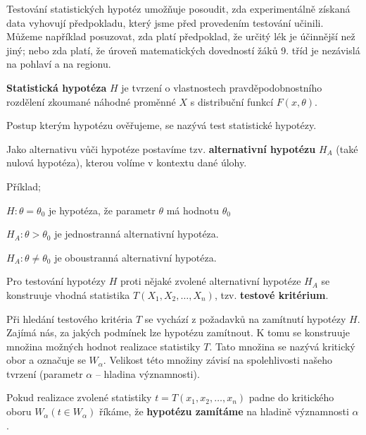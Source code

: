 \begin{compactitem}
    \item Testování statistických hypotéz umožňuje posoudit, zda experimentálně získaná data vyhovují předpokladu, který jsme před provedením testování učinili. Můžeme například posuzovat, zda platí předpoklad, že určitý lék je účinnější než jiný; nebo zda platí, že úroveň matematických dovedností žáků 9. tříd je nezávislá na pohlaví a na regionu.

    \item \textbf{Statistická hypotéza} $H$ je tvrzení o vlastnostech pravděpodobnostního rozdělení zkoumané náhodné proměnné $X$ s distribuční funkcí $F(x, \theta)$. \begin{compactitem}
        \item Postup kterým hypotézu ověřujeme, se nazývá test statistické hypotézy.
    \end{compactitem}

    \item Jako alternativu vůči hypotéze postavíme tzv. \textbf{alternativní hypotézu} $H_A$ (také nulová hypotéza), kterou volíme v kontextu dané úlohy. \begin{compactitem}
        \item Příklad;
        \item $H : \theta = \theta_0$ je  hypotéza, že parametr $\theta$ má hodnotu $\theta_0$
        \item $H_A : \theta > \theta_0$ je jednostranná alternativní hypotéza.
        \item $H_A : \theta \not= \theta_0$ je oboustranná alternativní hypotéza.
    \end{compactitem}

    \item Pro testování hypotézy $H$ proti nějaké zvolené alternativní hypotéze $H_A$ se konstruuje vhodná statistika $T(X_1, X_2, \ldots, X_n)$, tzv. \textbf{testové kritérium}.

    \item Při hledání testového kritéria $T$ se vychází z požadavků na zamítnutí hypotézy $H$. Zajímá nás, za jakých podmínek lze hypotézu zamítnout. K tomu se konstruuje množina možných hodnot realizace statistiky $T$. Tato množina se nazývá kritický obor a označuje se $W_{\alpha}$. Velikost této množiny závisí na spolehlivosti našeho tvrzení (parametr $\alpha$ -- hladina významnosti). \begin{compactitem}
        \item Pokud realizace zvolené statistiky $t = T(x_1, x_2, \ldots, x_n)$ padne do kritického oboru $W_{\alpha}(t \in W_{\alpha})$ říkáme, že \textbf{hypotézu zamítáme} na hladině významnosti $\alpha$.
    \end{compactitem}


\end{compactitem}
